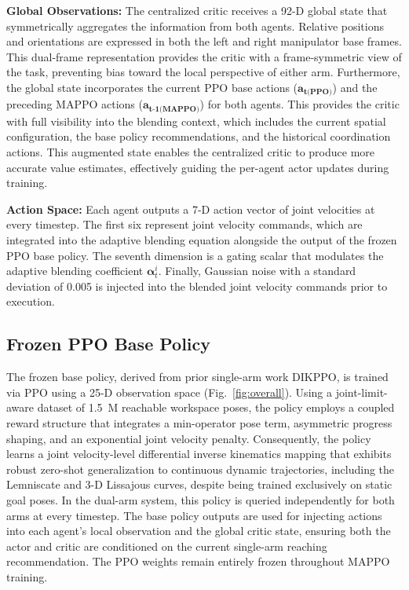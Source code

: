 \documentclass[lettersize,journal]{IEEEtran}
\begin{document}

\textbf{Global Observations:}
The centralized critic receives a 92-D global state that symmetrically aggregates the information from both agents. Relative positions and orientations are expressed in both the left and right manipulator base frames. This dual-frame representation provides the critic with a frame-symmetric view of the task, preventing bias toward the local perspective of either arm. Furthermore, the global state incorporates the current PPO base actions ($\mathbf{a_{\text{t(PPO)}}}$) and the preceding MAPPO actions ($\mathbf{a_{\text{t-1(MAPPO)}}}$) for both agents. This provides the critic with full visibility into the blending context, which includes the current spatial configuration, the base policy recommendations, and the historical coordination actions. This augmented state enables the centralized critic to produce more accurate value estimates, effectively guiding the per-agent actor updates during training.

\textbf{Action Space:}
Each agent outputs a 7-D action vector of joint velocities at every timestep. The first six represent joint velocity commands, which are integrated into the adaptive blending equation alongside the output of the frozen PPO base policy. The seventh dimension is a gating scalar that modulates the adaptive blending coefficient $\mathbf{\alpha}^{i}_{t}$. Finally, Gaussian noise with a standard deviation of 0.005 is injected into the blended joint velocity commands prior to execution.

\subsection{Frozen PPO Base Policy}
\label{base_ppo}
The frozen base policy, derived from prior single-arm work DIKPPO, is trained via PPO \cite{schulman2017proximal} using a 25-D observation space (Fig.~\ref{fig:overall}). Using a joint-limit-aware dataset of 1.5~M reachable workspace poses, the policy employs a coupled reward structure that integrates a min-operator pose term, asymmetric progress shaping, and an exponential joint velocity penalty. Consequently, the policy learns a joint velocity-level differential inverse kinematics mapping that exhibits robust zero-shot generalization to continuous dynamic trajectories, including the Lemniscate and 3-D Lissajous curves, despite being trained exclusively on static goal poses. In the dual-arm system, this policy is queried independently for both arms at every timestep. The base policy outputs are used for injecting actions into each agent's local observation and the global critic state, ensuring both the actor and critic are conditioned on the current single-arm reaching recommendation. The PPO weights remain entirely frozen throughout MAPPO training. 
\end{document}
